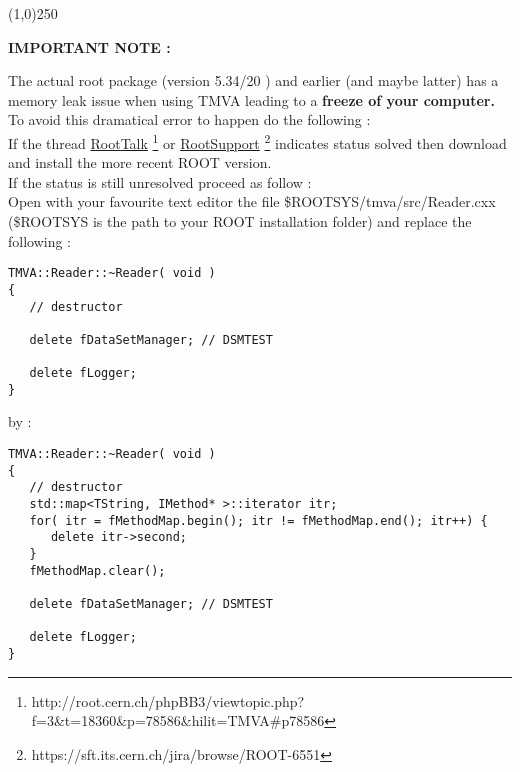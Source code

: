 \begin{center}
\line(1,0){250}
\end{center}

\begin{large}
\begin{center}
\textbf{IMPORTANT NOTE : } \\
\end{center}

\end{large} 
The actual root package (version 5.34/20 ) and earlier (and maybe latter) has a memory leak issue when using TMVA leading to a \textbf{freeze of your computer.}
To avoid this dramatical error to happen do the following : \\
If the thread 
\href{http://root.cern.ch/phpBB3/viewtopic.php?f=3&t=18360&p=78586&hilit=TMVA#p78586}{RootTalk}
\footnote{http://root.cern.ch/phpBB3/viewtopic.php?f=3\&t=18360\&p=78586\&hilit=TMVA\#p78586} 
or \href{https://sft.its.cern.ch/jira/browse/ROOT-6551}{RootSupport} \footnote{https://sft.its.cern.ch/jira/browse/ROOT-6551}
indicates status solved then download and install  the more recent ROOT version.\\
If the status is still unresolved proceed as follow : \\
Open with your favourite text editor the file  \$ROOTSYS/tmva/src/Reader.cxx (\$ROOTSYS is the path to your ROOT installation folder) and replace the following :\\

\begin{center}
\begin{minipage}{\textwidth}
\begin{lstlisting}
TMVA::Reader::~Reader( void )
{
   // destructor

   delete fDataSetManager; // DSMTEST

   delete fLogger;
}
\end{lstlisting}
\end{minipage}
\end{center}

by :\\
\begin{center}
\begin{minipage}{\textwidth}
\begin{lstlisting}
TMVA::Reader::~Reader( void )
{
   // destructor
   std::map<TString, IMethod* >::iterator itr;
   for( itr = fMethodMap.begin(); itr != fMethodMap.end(); itr++) {
      delete itr->second;
   }
   fMethodMap.clear();

   delete fDataSetManager; // DSMTEST

   delete fLogger;
}
\end{lstlisting}
\end{minipage}
\end{center}

